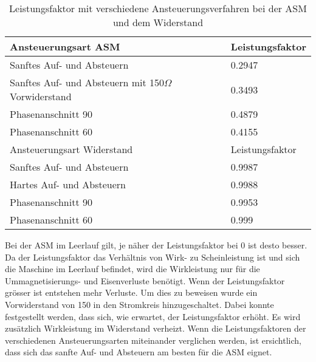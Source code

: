 \begin{table}[ht!]
	\centering
	\begin{tabular}{|l|l|}
		\hline
		Ansteuerungsart ASM                                   		& Leistungsfaktor \\ \hline 
		Sanftes Auf- und Absteuern                          		& 0.2947          \\ \hline
		Sanftes Auf- und Absteuern mit 150$\Omega$ Vorwiderstand 	& 0.3493          \\ \hline
		Phasenanschnitt 90\textdegree                               & 0.4879          \\ \hline
		Phasenanschnitt 60\textdegree                               & 0.4155          \\ \hline \hline
		Ansteuerungsart Widerstand                            		& Leistungsfaktor \\ \hline 
		Sanftes Auf- und Absteuern                          		& 0.9987          \\ \hline
		Hartes Auf- und Absteuern                                   & 0.9988          \\ \hline
		Phasenanschnitt 90\textdegree                         		& 0.9953          \\ \hline
		Phasenanschnitt 60\textdegree                         		& 0.999           \\ \hline
	\end{tabular}
\caption{Leistungsfaktor mit verschiedene Ansteuerungsverfahren bei der ASM und dem Widerstand}\label{tab:Leistungsfaktor_ASM_Widerstand}
\end{table}
Bei der ASM im Leerlauf gilt, je näher der Leistungsfaktor bei 0 ist desto besser. Da der Leistungsfaktor das Verhältnis von Wirk- zu Scheinleistung ist und sich die Maschine im Leerlauf befindet, wird die Wirkleistung nur für die Ummagnetisierungs- und Eisenverluste benötigt. Wenn der Leistungsfaktor grösser ist entstehen mehr Verluste. Um dies zu beweisen wurde ein Vorwiderstand von \SI{150}{\Omega} in den Stromkreis hinzugeschaltet. Dabei konnte festgestellt werden, dass sich, wie erwartet, der Leistungsfaktor erhöht. Es wird zusätzlich Wirkleistung im Widerstand verheizt. Wenn die Leistungsfaktoren der verschiedenen Ansteuerungsarten miteinander verglichen werden, ist ersichtlich, dass sich das sanfte Auf- und  Absteuern am besten für die ASM eignet.

